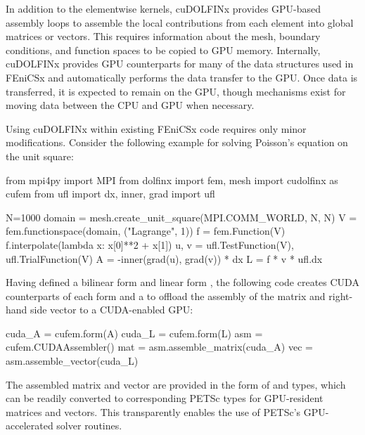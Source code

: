 In addition to the elementwise kernels, cuDOLFINx provides GPU-based assembly loops to assemble the local contributions from each element into global matrices or vectors. This requires information about the mesh, boundary conditions, and function spaces to be copied to GPU memory. Internally, cuDOLFINx provides GPU counterparts for many of the data structures used in FEniCSx and automatically performs the data transfer to the GPU. Once data is transferred, it is expected to remain on the GPU, though mechanisms exist for moving data between the CPU and GPU when necessary.

Using cuDOLFINx within existing FEniCSx code requires only minor modifications. Consider the following example for solving Poisson's equation on the unit square:
\begin{python}
from mpi4py import MPI
from dolfinx import fem, mesh
import cudolfinx as cufem
from ufl import dx, inner, grad
import ufl

N=1000
domain = mesh.create_unit_square(MPI.COMM_WORLD, N, N)
V = fem.functionspace(domain, ("Lagrange", 1))
f = fem.Function(V)
f.interpolate(lambda x: x[0]**2 + x[1])
u, v = ufl.TestFunction(V), ufl.TrialFunction(V)
A = -inner(grad(u), grad(v)) * dx
L = f * v * ufl.dx
\end{python}
Having defined a bilinear form  and linear form , the following code creates CUDA counterparts of each form and a  to offload the assembly of the matrix and right-hand side vector to a CUDA-enabled GPU:
\begin{python}
cuda_A = cufem.form(A)
cuda_L = cufem.form(L)
asm = cufem.CUDAAssembler()
mat = asm.assemble_matrix(cuda_A)
vec = asm.assemble_vector(cuda_L)
\end{python}
The assembled matrix and vector are provided in the form of  and  types, which can be readily converted to corresponding PETSc types for GPU-resident matrices and vectors. This transparently enables the use of PETSc's GPU-accelerated solver routines.



